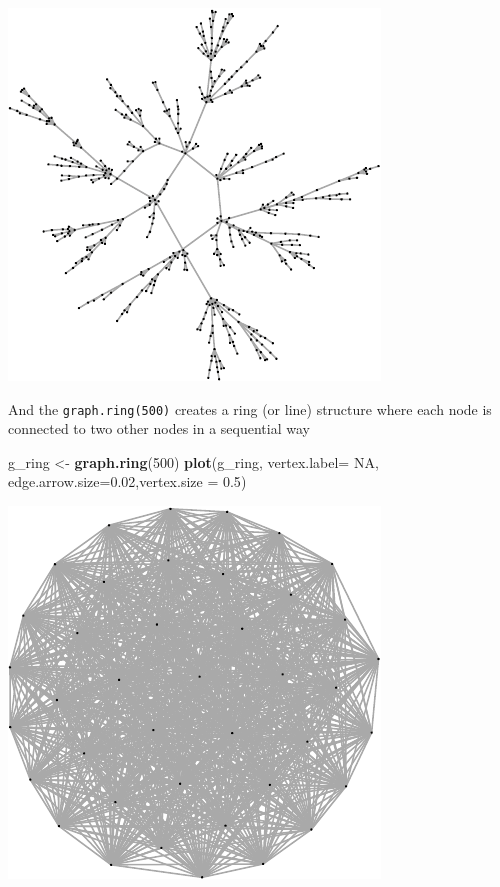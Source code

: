 \documentclass[]{article}
\newenvironment{Shaded}{\begin{snugshade}}{\end{snugshade}}
\newcommand{\KeywordTok}[1]{\textcolor[rgb]{0.13,0.29,0.53}{\textbf{{#1}}}}
\newcommand{\DataTypeTok}[1]{\textcolor[rgb]{0.13,0.29,0.53}{{#1}}}
\newcommand{\DecValTok}[1]{\textcolor[rgb]{0.00,0.00,0.81}{{#1}}}
\newcommand{\FloatTok}[1]{\textcolor[rgb]{0.00,0.00,0.81}{{#1}}}
\newcommand{\StringTok}[1]{\textcolor[rgb]{0.31,0.60,0.02}{{#1}}}
\newcommand{\OtherTok}[1]{\textcolor[rgb]{0.56,0.35,0.01}{{#1}}}
\newcommand{\NormalTok}[1]{{#1}}
\begin{document}
\includegraphics{ResearchTools_files/figure-latex/unnamed-chunk-49-1.pdf}

And the \texttt{graph.ring(500)} creates a ring (or line) structure
where each node is connected to two other nodes in a sequential way

\begin{Shaded}
\begin{Highlighting}[]
\NormalTok{g_ring <-}\StringTok{ }\KeywordTok{graph.ring}\NormalTok{(}\DecValTok{500}\NormalTok{)}
\KeywordTok{plot}\NormalTok{(g_ring, }\DataTypeTok{vertex.label=} \OtherTok{NA}\NormalTok{, }\DataTypeTok{edge.arrow.size=}\FloatTok{0.02}\NormalTok{,}\DataTypeTok{vertex.size =} \FloatTok{0.5}\NormalTok{)}
\end{Highlighting}
\end{Shaded}

\includegraphics{ResearchTools_files/figure-latex/unnamed-chunk-50-1.pdf}
\end{document}

